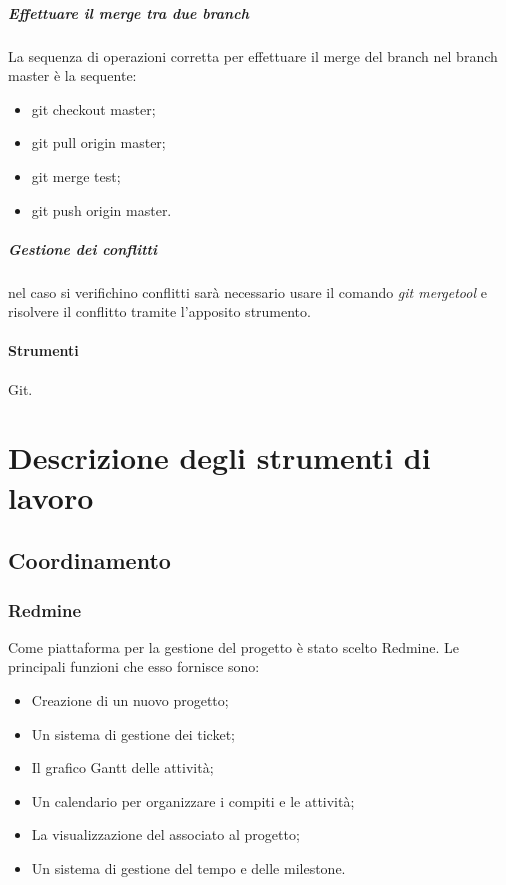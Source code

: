 \subparagraph{Effettuare il merge tra due branch}
\label{merge}
La sequenza di operazioni corretta per effettuare il merge del branch \og  {} nel branch master è la sequente:
\begin{itemize}
\item git checkout master;
\item git pull origin master;
\item git merge test;
\item git push origin master.
\end{itemize}

\subparagraph{Gestione dei conflitti} nel caso si verifichino conflitti sarà necessario usare il comando \textit{git mergetool} e risolvere il conflitto tramite l'apposito strumento.

\paragraph{Strumenti}
Git.




\appendix
\newpage
\section{Descrizione degli strumenti di lavoro}


\subsection{Coordinamento}

\subsubsection{Redmine}
\label{4.1}
Come piattaforma per la gestione del progetto è stato scelto Redmine. Le principali funzioni che esso fornisce sono:
\begin{itemize}
\item Creazione di un nuovo progetto;
\item Un sistema di gestione dei ticket;
\item Il grafico Gantt delle attività;
\item Un calendario per organizzare i compiti e le attività;
\item La visualizzazione del  associato al progetto;
\item Un sistema di  gestione del tempo e delle milestone.
\end{itemize}



